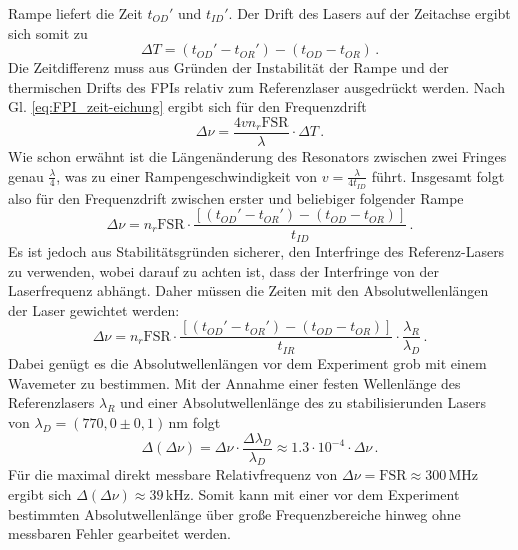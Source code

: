 Rampe liefert die Zeit $t_{OD}'$ und $t_{ID}'$. Der Drift des Lasers auf der
Zeitachse ergibt sich somit zu
\begin{equation}\label{eq:FPI_zeitdrift}
	\Delta T=\left(t_{OD}'-t_{OR}'\right)-\left(t_{OD}-t_{OR}\right)\,.
\end{equation}
Die Zeitdifferenz muss aus Gründen der Instabilität der Rampe und der
thermischen Drifts des FPIs relativ zum Referenzlaser ausgedrückt werden. Nach
Gl.
\eqref{eq:FPI_zeit-eichung} ergibt sich für den Frequenzdrift
\begin{equation}\label{eq:FPI_frequenzdrift_01}
	\Delta\nu=\frac{4vn_r\text{FSR}}{\lambda}\cdot\Delta T\,.
\end{equation}
Wie schon erwähnt ist die Längenänderung des Resonators zwischen zwei Fringes
genau $\frac{\lambda}{4}$, was zu einer Rampengeschwindigkeit von
$v=\frac{\lambda}{4t_{ID}}$ führt. Insgesamt folgt also für den Frequenzdrift
zwischen erster und beliebiger folgender Rampe
\begin{equation}\label{eq:FPI_frequenzdrift_02}
	\Delta\nu=n_r\text{FSR}\cdot\frac{\left[\left(t_{OD}'-t_{OR}'\right)-\left(t_{OD}-t_{OR}\right)\right]}{t_{ID}}\,.
\end{equation}
Es ist jedoch aus Stabilitätsgründen sicherer, den Interfringe des
Referenz-Lasers zu verwenden, wobei darauf zu achten ist, dass der Interfringe
von der Laserfrequenz abhängt. Daher müssen die Zeiten mit den
Absolutwellenlängen der Laser gewichtet werden:
\begin{equation}\label{eq:FPI_frequenzdrift_03}
	\Delta\nu=n_r\text{FSR}\cdot\frac{\left[\left(t_{OD}'-t_{OR}'\right)-\left(t_{OD}-t_{OR}\right)\right]}{t_{IR}}\cdot\frac{\lambda_R}{\lambda_D}\,.
\end{equation}
Dabei genügt es die Absolutwellenlängen vor dem Experiment grob mit einem
Wavemeter zu bestimmen. Mit der Annahme einer festen Wellenlänge
des Referenzlasers $\lambda_R$ und einer Absolutwellenlänge
des zu stabilisierunden Lasers von $\lambda_D=(770,0\pm0,1)\,$nm folgt
\begin{equation}\label{eq:FPI_frequenzdrift_fehler}
	\Delta(\Delta\nu)=\Delta\nu\cdot\frac{\Delta\lambda_D}{\lambda_D}\approx1.3\cdot10^{-4}\cdot\Delta\nu\,.
\end{equation}
Für die maximal direkt messbare Relativfrequenz von
$\Delta\nu=\text{FSR}\approx300\,$MHz ergibt sich
$\Delta(\Delta\nu)\approx39\,$kHz. Somit kann mit einer vor
dem Experiment bestimmten Absolutwellenlänge über große Frequenzbereiche hinweg
ohne messbaren Fehler gearbeitet werden.\par
